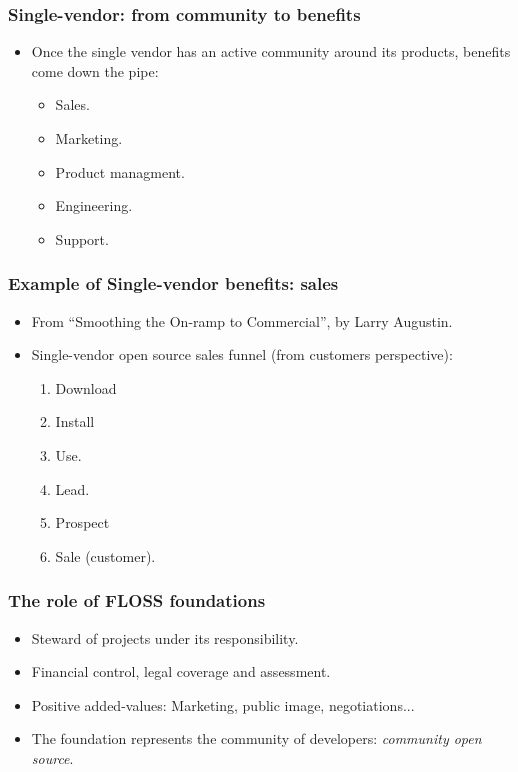 
\begin{frame}
\frametitle{Single-vendor: from community to benefits}
\begin{itemize}
  \item Once the single vendor has an active community around its products,
benefits come down the pipe:
  \begin{itemize}
   \item Sales.
   \item Marketing.
   \item Product managment.
   \item Engineering.
   \item Support.
  \end{itemize}

\end{itemize}
\end{frame}


\begin{frame}
\frametitle{Example of Single-vendor benefits: sales}
\begin{itemize}
  \item From ``Smoothing the On-ramp to Commercial'', by Larry Augustin.
  \item Single-vendor open source sales funnel (from customers perspective):
  \begin{enumerate}
   \item Download
   \item Install
   \item Use.
   \item Lead.
   \item Prospect
   \item Sale (customer).
  \end{enumerate}

\end{itemize}
\end{frame}


\begin{frame}
\frametitle{The role of FLOSS foundations}
\begin{itemize}
  \item Steward of projects under its responsibility.
  \item Financial control, legal coverage and assessment.
  \item Positive added-values: Marketing, public image, negotiations...
  \item The foundation represents the community of developers: 
  \textit{community open source}.
\end{itemize}
\end{frame}

